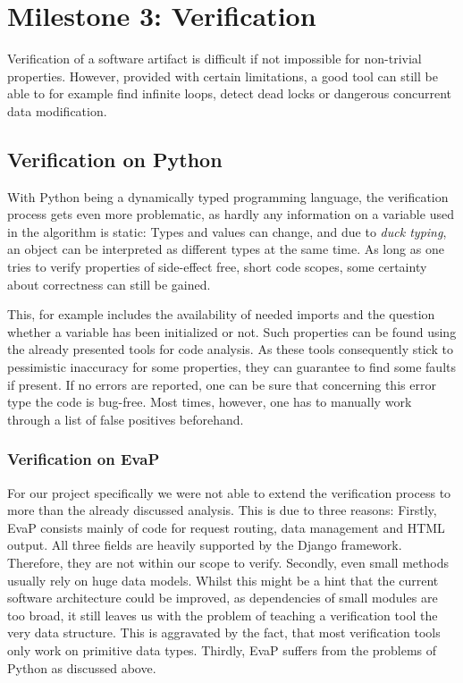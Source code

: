 \section{Milestone 3: Verification}

Verification of a software artifact is difficult if not impossible for non-trivial properties.
However, provided with certain limitations, a good tool can still be able to for example find infinite loops, detect dead locks or dangerous concurrent data modification.

\subsection{Verification on Python}

With Python being a dynamically typed programming language, the verification process gets even more problematic, as hardly any information on a variable used in the algorithm is static:
Types and values can change, and due to \textit{duck typing}, an object can be interpreted as different types at the same time.
As long as one tries to verify properties of side-effect free, short code scopes, some certainty about correctness can still be gained.

This, for example includes the availability of needed imports and the question whether a variable has been initialized or not.
Such properties can be found using the already presented tools for code analysis.
As these tools consequently stick to pessimistic inaccuracy for some properties, they can guarantee to find some faults if present.
If no errors are reported, one can be sure that concerning this error type the code is bug-free.
Most times, however, one has to manually work through a list of false positives beforehand.

\subsubsection{Verification on EvaP}

For our project specifically we were not able to extend the verification process to more than the already discussed analysis.
This is due to three reasons:
Firstly, EvaP consists mainly of code for request routing, data management and HTML output.
All three fields are heavily supported by the Django framework. Therefore, they are not within our scope to verify.
Secondly, even small methods usually rely on huge data models.
Whilst this might be a hint that the current software architecture could be improved, as dependencies of small modules are too broad, it still leaves us with the problem of teaching a verification tool the very data structure.
This is aggravated by the fact, that most verification tools only work on primitive data types.
Thirdly, EvaP suffers from the problems of Python as discussed above.

